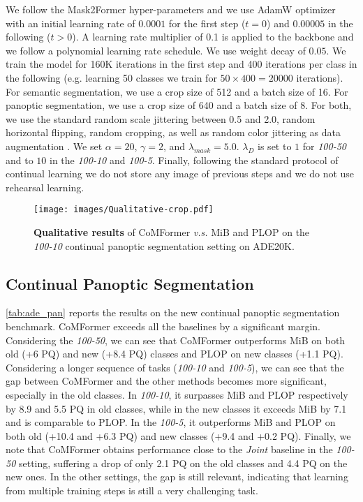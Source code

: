 \documentclass[10pt,twocolumn,letterpaper]{article}
\begin{document}
We follow the Mask2Former \cite{cheng2021masked} hyper-parameters and we use AdamW \cite{ilya2019decoupled} optimizer with an initial learning rate of $0.0001$ for the first step ($t=0$) and $0.00005$ in the following ($t>0$). A learning rate multiplier of 0.1 is applied to the backbone and we follow a polynomial learning rate schedule. We use weight decay of $0.05$. We train the model for 160K iterations in the first step and 400 iterations per class in the following (e.g. learning 50 classes we train for $50 \times 400 = 20000$ iterations).
For semantic segmentation, we use a crop size of 512 and a batch size of 16. For panoptic segmentation, we use a crop size of 640 and a batch size of 8. For both, we use the standard random scale jittering between 0.5 and 2.0, random horizontal flipping, random cropping, as well as random color jittering as data augmentation \cite{cheng2021maskformer}. We set $\alpha=20$, $\gamma=2$, and $\lambda_{mask}=5.0$. $\lambda_D$ is set to $1$ for \textit{100-50} and to $10$ in the \textit{100-10} and \textit{100-5}.
Finally, following the standard protocol of continual learning \cite{cermelli2020modelingthebackground, douillard2020plop} we do not store any image of previous steps and we do not use rehearsal learning.

\begin{figure*}
    \texttt{[image: images/Qualitative-crop.pdf]}
    \caption{\textbf{Qualitative results} of CoMFormer \textit{v.s.} MiB and PLOP on the \textit{100-10} continual panoptic segmentation setting on ADE20K.}
    \label{fig:qualitative_results} \vspace{-1em}
\end{figure*}

\subsection{Continual Panoptic Segmentation}
\cref{tab:ade_pan} reports the results on the new continual panoptic segmentation benchmark. CoMFormer exceeds all the baselines by a significant margin. Considering the \textit{100-50}, we can see that CoMFormer outperforms MiB on both old (+6 PQ) and new (+8.4 PQ) classes and PLOP on new classes (+1.1 PQ). Considering a longer sequence of tasks (\textit{100-10} and \textit{100-5}), we can see that the gap between CoMFormer and the other methods becomes more significant, especially in the old classes. In \textit{100-10}, it surpasses MiB and PLOP respectively by 8.9 and 5.5 PQ in old classes, while in the new classes it exceeds MiB by 7.1 and is comparable to PLOP. In the \textit{100-5}, it outperforms MiB and PLOP on both old (+10.4 and +6.3 PQ) and new classes (+9.4 and +0.2 PQ). Finally, we note that CoMFormer obtains performance close to the \textit{Joint} baseline in the \textit{100-50} setting, suffering a drop of only 2.1 PQ on the old classes and 4.4 PQ on the new ones. In the other settings, the gap is still relevant, indicating that learning from multiple training steps is still a very challenging task. 
\end{document}
